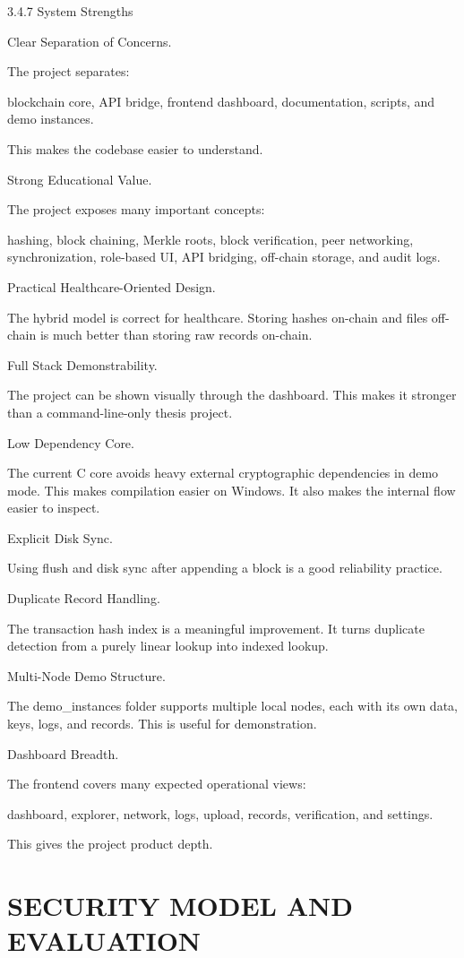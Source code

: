 \documentclass[12pt]{article}
\begin{document}
3.4.7 System Strengths

 Clear Separation of Concerns.

The project separates:

 blockchain core, API bridge, frontend dashboard, documentation, scripts, and demo instances.

This makes the codebase easier to understand.

 Strong Educational Value.

The project exposes many important concepts:

 hashing, block chaining, Merkle roots, block verification, peer networking, synchronization, role-based UI, API bridging, off-chain storage, and audit logs.

 Practical Healthcare-Oriented Design.

The hybrid model is correct for healthcare. Storing hashes on-chain and files off-chain is much better than storing raw records on-chain.

 Full Stack Demonstrability.

The project can be shown visually through the dashboard. This makes it stronger than a command-line-only thesis project.

 Low Dependency Core.

The current C core avoids heavy external cryptographic dependencies in demo mode. This makes compilation easier on Windows. It also makes the internal flow easier to inspect.

 Explicit Disk Sync.

Using flush and disk sync after appending a block is a good reliability practice.

 Duplicate Record Handling.

The transaction hash index is a meaningful improvement. It turns duplicate detection from a purely linear lookup into indexed lookup.

 Multi-Node Demo Structure.

The demo\_instances folder supports multiple local nodes, each with its own data, keys, logs, and records. This is useful for demonstration.

 Dashboard Breadth.

The frontend covers many expected operational views:

 dashboard, explorer, network, logs, upload, records, verification, and settings.

This gives the project product depth.


\newpage
\section{SECURITY MODEL AND EVALUATION}
\end{document}
